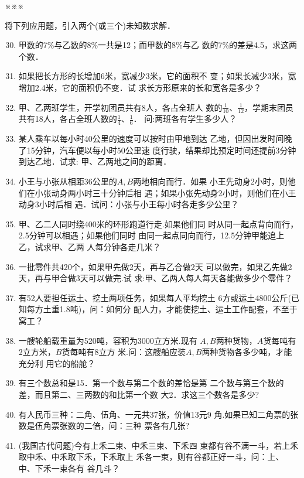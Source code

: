 \begin{center}
※\qquad\qquad ※\qquad\qquad ※
\end{center}

将下列应用题，引入两个(或三个)未知数求解．

\begin{enumerate}\setcounter{enumi}{29}
    \item  甲数的7\%与乙数的8\%一共是12；而甲数的8\%与乙
    数的7\%的差是4.5，求这两个数．
    \item 如果把长方形的长增加6米，宽减少3米，它的面积不
    变；如果长减少3米，宽增加2.4米，它的面积仍不变．试
    求长方形原来的长和宽各是多少？
    \item 甲、乙两班学生，开学初团员共有8人，各占全班人
    数的$\frac{1}{10}$、$\frac{1}{12}$，学期末团员共有18人，各占全班人数的$\frac{1}{4}$、$\frac{1}{6}$．
    问:两班各有学生多少人？
    \item 某人乘车以每小时40公里的速度可以按时由甲地到达
    乙地，但因出发时间晚了15分钟，汽车便以每小时50公里速
    度行驶，结果却比预定时间还提前3分钟到达乙地．试求:
    甲、乙两地之间的距离．
    \item 小王与小张从相距36公里的$A, B$两地相向而行．如果
    小王先动身2小时，则他们在小张动身两小时三十分钟后相
    遇；如果小张先动身2小时，则他们在小王动身3小时后相
    遇．试问：小张与小王每小时各走多少公里？
    \item 甲、乙二人同时绕400米的环形跑道行走.如果他们同
    时从同一起点背向而行，2.5分钟可以相遇；如果他们同时
    由同一起点同向而行，12.5分钟甲能追上乙，试求甲、乙两
    人每分钟各走几米？
    \item 一批零件共420个，如果甲先做2天，再与乙合做2天
    可以做完，如果乙先做2天，再与甲合做3天可以做完.试
    求:甲、乙两人每人每天各能做多少个零件？
    \item 有52人要担任运土、挖土两项任务，如果每人平均挖土
    6方或运土4800公斤(已知每方土重1.8吨)，问：如何分
    配人力，才能使挖土、运土工作配套，不至于窝工？
    \item 一艘轮船载重量为520吨，容积为3000立方米.现有
    $A, B$两种货物，$A$货每吨有2立方米，$B$货每吨有8立方
    米.问：这艘船应装$A, B$两种货物各多少吨，才能充分利
    用它的船舱？
    \item 有三个数总和是15．第一个数与第二个数的差恰是第
    二个数与第三个数的差，而且第二、三两数的和比第一个数
    大2．求这三个数各是多少?
    \item 有人民币三种：二角、伍角、一元共37张，价值13元9
    角.如果已知二角票的张数是伍角票张数的二倍，问：三种
    票各有几张?
    \item (我国古代问题)今有上禾二束、中禾三束、下禾四
    束都有谷不满一斗，若上禾取中禾、中禾取下禾，下禾取上
    禾各一束，则有谷都正好一斗，问：上、中、下禾一束各有
    谷几斗？
    
\end{enumerate}

